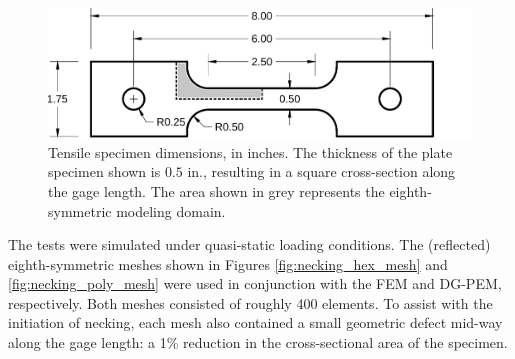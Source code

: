 \begin{figure}[!h]
  \centering
  \includegraphics[width=6.0in]{figures/tensile_specimen_dimensions.pdf}
  \caption{Tensile specimen dimensions, in inches. The thickness of the plate specimen shown is $0.5$ in., resulting in a square cross-section along the gage length. The area shown in grey represents the eighth-symmetric modeling domain.}
  \label{fig:tensile_specimen_dimensions}
\end{figure}

The tests were simulated under quasi-static loading conditions. The (reflected) eighth-symmetric meshes shown in Figures \ref{fig:necking_hex_mesh} and \ref{fig:necking_poly_mesh} were used in conjunction with the FEM and DG-PEM, respectively. Both meshes consisted of roughly 400 elements. To assist with the initiation of necking, each mesh also contained a small geometric defect mid-way along the gage length: a 1\% reduction in the cross-sectional area of the specimen.

